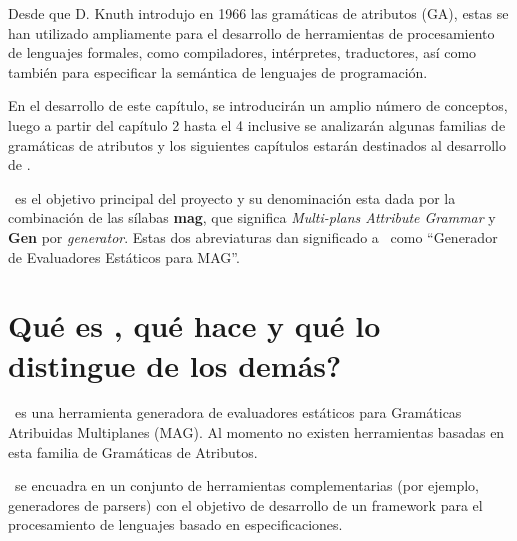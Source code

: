 Desde que D. Knuth introdujo en 1966 las gramáticas de atributos (GA)\cite{Knuth}, estas se han utilizado ampliamente para el desarrollo de herramientas de procesamiento de lenguajes formales, como compiladores, intérpretes, traductores, así  como también para especificar la semántica de lenguajes de programación.

En el desarrollo de este capítulo, se introducirán un amplio número de conceptos, luego a partir del capítulo 2 hasta el 4 inclusive se analizarán algunas familias de gramáticas de atributos y los siguientes capítulos estarán destinados al desarrollo de \maggen. 

\maggen\ es el objetivo principal del proyecto y su denominación esta dada por la combinación de las sílabas \textbf{mag}, que significa \textit{Multi-plans Attribute Grammar} y \textbf{Gen} por \textit{generator}. Estas dos abreviaturas dan significado a \maggen\ como ``Generador de Evaluadores Estáticos para MAG''.

\section{\textquestiondown Qué es \maggen, qué hace y qué lo distingue de los demás?}

\maggen\ es una herramienta generadora de evaluadores estáticos para Gramáticas Atribuidas Multiplanes (MAG). Al momento no existen herramientas basadas en esta familia de Gramáticas de Atributos. 

\maggen\ se encuadra en un conjunto de herramientas complementarias (por ejemplo, generadores de parsers) con el objetivo de desarrollo de un framework para el procesamiento de lenguajes basado en especificaciones.

